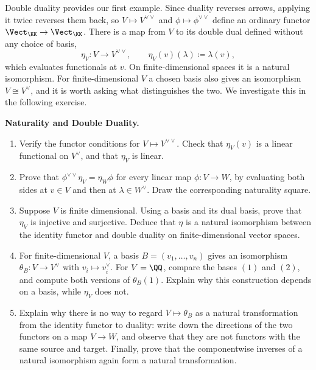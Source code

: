 \documentclass[12pt,reqno]{amsart}
\begin{document}
Double duality provides our first example. Since duality reverses arrows, applying it twice reverses them back, so $V\mapsto V^{\vee\vee}$ and $\phi\mapsto\phi^{\vee\vee}$ define an ordinary functor $\Vect_{\KK}\to\Vect_{\KK}$. There is a map from $V$ to its double dual defined without any choice of basis,
\[
\eta_V:V\longrightarrow V^{\vee\vee},\qquad \eta_V(v)(\lambda)\coloneqq\lambda(v),
\]
which evaluates functionals at $v$. On finite-dimensional spaces it is a natural isomorphism. For finite-dimensional $V$ a chosen basis also gives an isomorphism $V\cong V^{\vee}$, and it is worth asking what distinguishes the two. We investigate this in the following exercise.

\hrulefill

\begin{problems}
\item\label{c:doubledual} \textbf{Naturality and Double Duality.}
\begin{enumerate}
\item Verify the functor conditions for $V\mapsto V^{\vee\vee}$. Check that $\eta_V(v)$ is a linear functional on $V^{\vee}$, and that $\eta_V$ is linear.
\item Prove that $\phi^{\vee\vee}\eta_V=\eta_W\phi$ for every linear map $\phi:V\to W$, by evaluating both sides at $v\in V$ and then at $\lambda\in W^{\vee}$. Draw the corresponding naturality square.
\item Suppose $V$ is finite dimensional. Using a basis and its dual basis, prove that $\eta_V$ is injective and surjective. Deduce that $\eta$ is a natural isomorphism between the identity functor and double duality on finite-dimensional vector spaces.
\item For finite-dimensional $V$, a basis $B=(v_1,\ldots,v_n)$ gives an isomorphism $\theta_B:V\to V^{\vee}$ with $v_i\mapsto v_i^{\vee}$. For $V=\QQ$, compare the bases $(1)$ and $(2)$, and compute both versions of $\theta_B(1)$. Explain why this construction depends on a basis, while $\eta_V$ does not.
\item Explain why there is no way to regard $V\mapsto\theta_B$ as a natural transformation from the identity functor to duality: write down the directions of the two functors on a map $V\to W$, and observe that they are not functors with the same source and target. Finally, prove that the componentwise inverses of a natural isomorphism again form a natural transformation.
\end{enumerate}
\end{problems}
\end{document}
